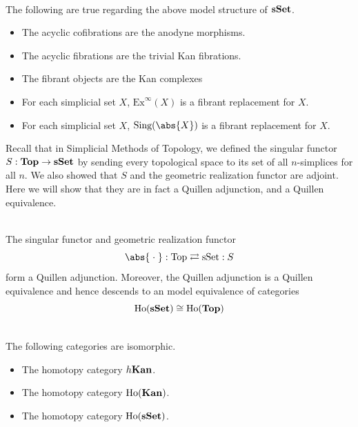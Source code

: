 \documentclass[a4paper]{article}
\begin{document}
\begin{lmm}{}{}\\
The following are true regarding the above model structure of $\bold{sSet}$. 
\begin{itemize}
\item The acyclic cofibrations are the anodyne morphisms. 
\item The acyclic fibrations are the trivial Kan fibrations. 
\item The fibrant objects are the Kan complexes
\item For each simplicial set $X$, $\text{Ex}^\infty(X)$ is a fibrant replacement for $X$. 
\item For each simplicial set $X$, $\text{Sing}(\abs{X})$ is a fibrant replacement for $X$. 
\end{itemize}
\end{lmm}

Recall that in Simplicial Methods of Topology, we defined the singular functor $S:\bold{Top}\to\bold{sSet}$ by sending every topological space to its set of all $n$-simplices for all $n$. We also showed that $S$ and the geometric realization functor are adjoint. Here we will show that they are in fact a Quillen adjunction, and a Quillen equivalence. 

\begin{thm}{}{}\\ The singular functor and geometric realization functor $$\abs{\;\cdot\;}:\text{Top}\rightleftarrows\text{sSet}:S$$ form a Quillen adjunction. Moreover, the Quillen adjunction is a Quillen equivalence and hence descends to an model equivalence of categories $$\text{Ho}(\bold{sSet})\cong\text{Ho}(\bold{Top})$$
\end{thm}

\begin{lmm}{}{}\\
The following categories are isomorphic. 
\begin{itemize}
\item The homotopy category $h\bold{Kan}$. 
\item The homotopy category $\text{Ho}(\bold{Kan})$. 
\item The homotopy category $\text{Ho}(\bold{sSet})$. 
\end{itemize}
\end{lmm}
\end{document}
